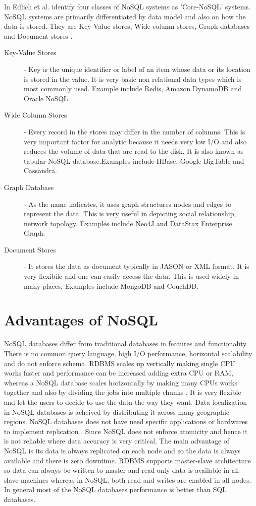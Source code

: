 \documentclass[sigconf]{acmart}
\begin{document}
In Edlich et al. identify four classes of NoSQL systems as 'Core-NoSQL' systems. NoSQL systems are primarily differentiated by data model and also on how the data is stored. They are Key-Value stores, Wide column stores, Graph databases and Document stores \cite{edmodel}.
\begin{description}

\item[Key-Value Stores] - Key is the unique identifier or label of an item whose data or its location is stored in the value. It is very basic non relational data types which is most commonly used. Example include Redis, Amazon DynamoDB and Oracle NoSQL. 

\item[Wide Column Stores] - Every record in the stores may differ in the number of columns. This is very important factor for analytic because it needs very low I/O and also reduces the volume of data that are read to the disk. It is also known as tabular NoSQL database.Examples include HBase, Google BigTable and Cassandra.

\item[Graph Database] - As the name indicates, it uses graph structures nodes and edges to represent the data. This is very useful in depicting social relationship, network topology. Examples include Neo4J and DataStax Enterprise Graph. 

\item[Document Stores] - It stores the data as document typically in JASON or XML format. It is very flexibile and one can easily access the data. This is used widely in many places. Examples include MongoDB and CouchDB.
\end{description}

\section{Advantages of NoSQL}

NoSQL databases differ from traditional databases in features and functionality. There is no common query language, high I/O performance, horizontal scalability and do not enforce schema. RDBMS scales up vertically making single CPU works faster and performance can be increased adding extra CPU or RAM, whereas a NoSQL database scales horizontally by making many CPUs works together and also by dividing the jobs into multiple chunks \cite{datastax}. It is very flexible and let the users to decide to use the data the way they want. Data localization in NoSQL databases is acheived by distributing it across many geographic regions. NoSQL databases does not have need specific applications or hardwares to implement replication \cite{mongo}. Since NoSQL does not enforce atomicity and hence it is not reliable where data accuracy is very critical. The main advantage of NoSQL is its data is always replicated on each node and so the data is always available and there is zero downtime. RDBMS supports master-slave architecture so data can always be written to master and read only data is available in all slave machines whereas in NoSQL, both read and writes are enabled in all nodes. In general most of the NoSQL databases performance is better than SQL databases.
\end{document}

